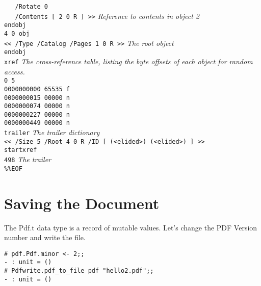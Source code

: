 \documentclass[a4paper]{memoir}
\begin{document}
\begin{framed}
\noindent\small\verb!   /Rotate 0!\\
\noindent\small\verb!   /Contents [ 2 0 R ] >>! \textit{Reference to contents in object 2}\\
\noindent\small\verb!endobj!\\
\noindent\small\verb!4 0 obj!\\
\noindent\small\verb!<< /Type /Catalog /Pages 1 0 R >>! \textit{The root object}\\
\noindent\small\verb!endobj!\\
\noindent\small\verb!xref! \textit{The cross-reference table, listing the byte offsets of each object for random access.}\\
\noindent\small\verb!0 5 !\\
\noindent\small\verb!0000000000 65535 f !\\
\noindent\small\verb!0000000015 00000 n !\\
\noindent\small\verb!0000000074 00000 n !\\
\noindent\small\verb!0000000227 00000 n !\\
\noindent\small\verb!0000000449 00000 n !\\
\noindent\small\verb!trailer! \textit{The trailer dictionary}\\
\noindent\small\verb!<< /Size 5 /Root 4 0 R /ID [ (<elided>) (<elided>) ] >>!\\
\noindent\small\verb!startxref!\\
\noindent\small\verb!498! \textit{The trailer}\\
\noindent\small\verb!%%EOF!\\
\end{framed}
\section*{Saving the Document}
The \textsf{Pdf.t} data type is a record of mutable values. Let's change the PDF Version number and write the file.
\begin{framed}
\begin{verbatim}
# pdf.Pdf.minor <- 2;;
- : unit = ()
# Pdfwrite.pdf_to_file pdf "hello2.pdf";;
- : unit = ()
\end{verbatim}
\end{framed}
\end{document}
